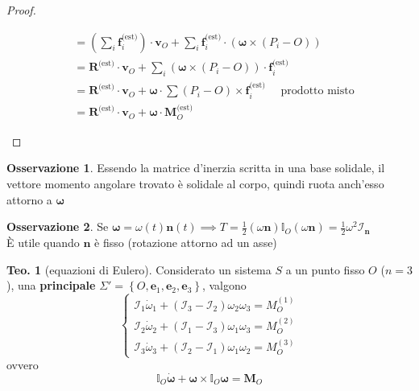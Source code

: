 \documentclass[a4paper,10pt]{article}
\theoremstyle{definition}
\newcommand{\bv}{\boldsymbol} %
\theoremstyle{indentdefinition}
\theoremstyle{indenttheorem}
\newtheorem{thm}{Teo.}
\theoremstyle{myremark}
\newtheorem*{rem*}{Osservazione}
\theoremstyle{indentgeneral}
\newenvironment{myboxed} 
{\noindent\begin{lrbox}{\mybox}\begin{minipage}{\textwidth}}
{\end{minipage}\end{lrbox}\fbox{\usebox{\mybox}}}
\begin{document}
\begin{proof}
\begin{enumerate}
\begin{align*}
&=(\sum_i\bv{f}_i^{\text{(est)}})\cdot\bv{v}_O+\sum_i \bv{f}_i^{\text{(est)}}\cdot(\boldsymbol{\omega}\times\left(P_{i}-O\right)) \\
&= \boldsymbol{R}^{\text{(est)}}\cdot\boldsymbol{v}_{O}+\sum_i (\boldsymbol{\omega}\times\left(P_{i}-O\right))\cdot \bv{f}_i^{\text{(est)}} \\
&=\boldsymbol{R}^{\text{(est)}}\cdot\boldsymbol{v}_{O}+\boldsymbol{\omega}\cdot\sum\left(P_{i}-O\right)\times\boldsymbol{f}_{i}^{\text{(est)}} \quad\text{ prodotto misto}\\
&=\boldsymbol{R}^{\text{(est)}}\cdot\boldsymbol{v}_{O}+\boldsymbol{\omega}\cdot\boldsymbol{M}_{O}^{\text{(est)}}
\end{align*}
\end{enumerate}
\end{proof}

\begin{rem*}
    Essendo la matrice d'inerzia scritta in una base solidale, il vettore momento angolare trovato è solidale al corpo, quindi ruota anch'esso attorno a $\bv{\omega}$
\end{rem*}

\begin{rem*}
    Se $\bv{\omega}=\omega(t)\bv{n}(t)\implies T=\frac{1}{2}(\omega\bv{n})\mathbb{I}_O(\omega\bv{n})=\frac{1}{2}\omega^2\mathcal{I}_{\bv{n}}$ \\
    È utile quando $\bv{n}$ è fisso (rotazione attorno ad un asse)
\end{rem*}

\begin{myboxed}
\begin{thm}[equazioni di Eulero]
\label{thm:equazioni-Eulero}Considerato un sistema $S$ a un punto
fisso $O$ ($n=3$), una  \textbf{principale}
\textup{$\Sigma'=\left\{ O,\boldsymbol{e}_{1},\boldsymbol{e}_{2},\boldsymbol{e}_{3}\right\} $,
valgono
\[
\begin{cases}
\mathcal{I}_{1}\dot{\omega}_{1}+\left(\mathcal{I}_{3}-\mathcal{I}_{2}\right)\omega_{2}\omega_{3}=M_{O}^{\left(1\right)}\\
\mathcal{I}_{2}\dot{\omega}_{2}+\left(\mathcal{I}_{1}-\mathcal{I}_{3}\right)\omega_{1}\omega_{3}=M_{O}^{\left(2\right)}\\
\mathcal{I}_{3}\dot{\omega}_{3}+\left(\mathcal{I}_{2}-\mathcal{I}_{1}\right)\omega_{1}\omega_{2}=M_{O}^{\left(3\right)}
\end{cases}
\]
}
ovvero
$$\mathbb{I}_O\dot{\bv{\omega}}+\bv{\omega}\times\mathbb{I}_O\bv{\omega}=\bv{M}_O$$
\end{thm}
\end{myboxed}
\end{document}
